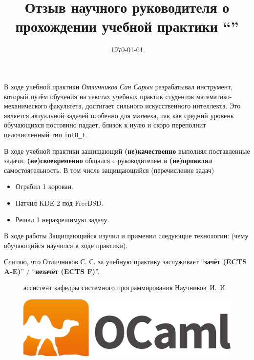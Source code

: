 \documentclass{article}
\title{Отзыв научного руководителя о прохождении  учебной практики \enquote{\worktitle}}
\date{\today}
\begin{document}
\maketitle
В ходе  учебной  практики \textit{Отличников Сан Сарыч} разрабатывал инструмент, 
который путём обучения на текстах учебных практик студентов математико-механического факультета,
достигает сильного искусственного интеллекта. 
Это является актуальной задачей особенно для матмеха, так как средний уровень обучающихся постоянно падает, близок к нулю и скоро переполнит целочисленный тип \verb=int8_t=.

В ходе учебной практики защищающий \textbf{(не)качественно} выполнял поставленные задачи,
\textbf{(не)своевременно} общался с руководителем и 
\textbf{(не)проявлял} самостоятельность. 
В том числе защищающийся {\small (перечисление задач)}
\begin{itemize}
\item Ограбил  1 корован.
\item Патчил KDE 2 под FreeBSD.
\item Решал 1 неразрешимую задачу.
\end{itemize}

\noindent В ходе работы Защищающийся изучил и применил следующие технологии: (чему обучающийся научился в ходе практики).

Считаю, что Отличников С. С. за учебную практику заслуживает \enquote{\textbf{зачёт (ECTS A-E)}} / \enquote{\textbf{незачёт (ECTS F)}}.

\vspace{1cm}
\begin{figure}[!htb]
    \centering
    \begin{minipage}{.4\textwidth}
        \centering
     ассистент кафедры системного программирования Научников~И.~И.
    \end{minipage}%
    \begin{minipage}{0.58\textwidth}
    \begin{flushright}
     \includegraphics[width=.35\linewidth]{signature.png}\\
    \end{flushright}
    \end{minipage}
\end{figure}
\end{document}
